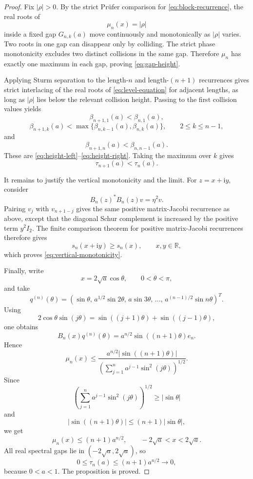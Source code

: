 \documentclass[11pt]{amsart}
\numberwithin{equation}{section}
\newcommand{\R}{\mathbb R}
\newcommand{\ii}{\mathrm i}
\newcommand{\B}{B}
\begin{document}
\begin{proof}
Fix \(|\rho|>0\).  By the strict Pr\"ufer comparison for \eqref{eq:block-recurrence}, the real roots of
\[
\mu_n(x)=|\rho|
\tag{3.18}\label{eq:level-equation}
\]
inside a fixed gap \(G_{n,k}(a)\) move continuously and monotonically as \(|\rho|\) varies.  Two roots in one gap can disappear only by colliding.  The strict phase monotonicity excludes two distinct collisions in the same gap.  Therefore \(\mu_n\) has exactly one maximum in each gap, proving \eqref{eq:gap-height}.

Applying Sturm separation to the length-\(n\) and length-\((n+1)\) recurrences gives strict interlacing of the real roots of \eqref{eq:level-equation} for adjacent lengths, as long as \(|\rho|\) lies below the relevant collision height.  Passing to the first collision values yields
\[
\beta_{n+1,1}(a)<\beta_{n,1}(a),
\]
\[
\beta_{n+1,k}(a)
<
\max\{\beta_{n,k-1}(a),\beta_{n,k}(a)\},
\qquad 2\le k\le n-1,
\]
and
\[
\beta_{n+1,n}(a)<\beta_{n,n-1}(a).
\]
These are \eqref{eq:height-left}--\eqref{eq:height-right}.  Taking the maximum over \(k\) gives
\[
\tau_{n+1}(a)<\tau_n(a).
\]

It remains to justify the vertical monotonicity and the limit.  For \(z=x+\ii y\), consider
\[
\B_n(z)^*\B_n(z)v=\eta^2v.
\tag{3.19}
\]
Pairing \(v_j\) with \(v_{n+1-j}\) gives the same positive matrix-Jacobi recurrence as above, except that the diagonal Schur complement is increased by the positive term \(y^2I_2\).  The finite comparison theorem for positive matrix-Jacobi recurrences therefore gives
\[
s_n(x+\ii y)\ge s_n(x),
\qquad x,y\in\R,
\]
which proves \eqref{eq:vertical-monotonicity}.

Finally, write
\[
x=2\sqrt a\cos\theta,\qquad 0<\theta<\pi,
\]
and take
\[
q^{(n)}(\theta)
=
\left(
\sin\theta,\,
a^{1/2}\sin2\theta,\,
a\sin3\theta,\,
\dots,\,
a^{(n-1)/2}\sin n\theta
\right)^T.
\tag{3.20}\label{eq:trial-vector}
\]
Using
\[
2\cos\theta\sin(j\theta)
=
\sin((j+1)\theta)+\sin((j-1)\theta),
\tag{3.21}
\]
one obtains
\[
\B_n(x)q^{(n)}(\theta)
=
a^{n/2}\sin((n+1)\theta)e_n.
\tag{3.22}\label{eq:trial-residual}
\]
Hence
\[
\mu_n(x)
\le
\frac{
a^{n/2}|\sin((n+1)\theta)|
}{
\left(\sum_{j=1}^n a^{j-1}\sin^2(j\theta)\right)^{1/2}
}.
\tag{3.23}
\]
Since
\[
\left(\sum_{j=1}^n a^{j-1}\sin^2(j\theta)\right)^{1/2}
\ge |\sin\theta|
\]
and
\[
|\sin((n+1)\theta)|\le (n+1)|\sin\theta|,
\]
we get
\[
\mu_n(x)\le (n+1)a^{n/2},
\qquad -2\sqrt a<x<2\sqrt a.
\tag{3.24}\label{eq:upper-mu}
\]
All real spectral gaps lie in \((-2\sqrt a,2\sqrt a)\), so
\[
0\le\tau_n(a)\le (n+1)a^{n/2}\to0,
\]
because \(0<a<1\).  The proposition is proved.
\end{proof}
\end{document}
